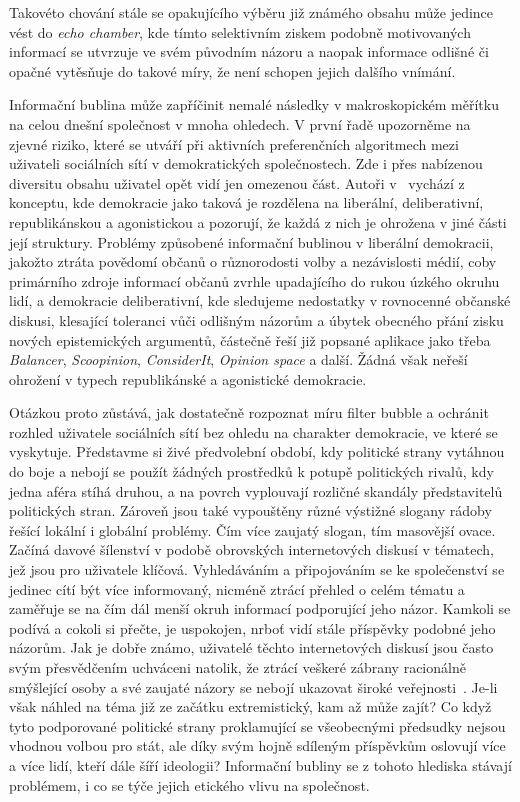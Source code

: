 \documentclass[12pt, a4paper]{article}
\numberwithin{equation}{section} 	%
\begin{document}
Takovéto chování stále se opakujícího výběru již známého obsahu může jedince vést do \textit{echo chamber}, kde tímto selektivním ziskem podobně motivovaných informací se utvrzuje ve svém původním názoru a naopak informace odlišné či opačné vytěsňuje do takové míry, že není schopen jejich dalšího vnímání.

Informační bublina může zapříčinit nemalé následky v makroskopickém mě\-ří\-tku na celou dnešní společnost v mnoha ohledech. V první řadě upozorněme na zjevné riziko, které se utváří při aktivních preferenčních algoritmech mezi uživateli sociálních sítí v demokratických společnostech. Zde i přes nabízenou diversitu obsahu uživatel opět vidí jen omezenou část. Autoři v~\cite{BreakingTheFilterBubble} vychází z konceptu, kde demokracie jako taková je rozdělena na liberální, deliberativní, republikánskou a agonistickou a pozorují, že každá z nich je ohrožena v jiné části její struktury. Problémy způsobené informační bublinou v liberální demokracii, jakožto ztráta povědomí občanů o různorodosti volby a nezávislosti médií, coby primárního zdroje informací občanů zvrhle upadajícího do rukou úzkého okruhu lidí, a demokracie deliberativní, kde sledujeme nedostatky v rovnocenné občanské diskusi, klesající toleranci vůči odlišným názorům a úbytek obecného přání zisku nových epistemických argumentů, částečně řeší již popsané aplikace jako třeba \textit{Balancer}, \textit{Scoopinion}, \textit{ConsiderIt}, \textit{Opinion space} a další. Žádná však neřeší ohrožení v typech republikánské a agonistické demokracie.

Otázkou proto zůstává, jak dostatečně rozpoznat míru filter bubble a ochránit rozhled uživatele sociálních sítí bez ohledu na charakter demokracie, ve které se vyskytuje. Představme si živé předvolební období, kdy politické strany vytáhnou do boje a nebojí se použít žádných prostředků k potupě politických rivalů, kdy jedna aféra stíhá druhou, a na povrch vyplouvají rozličné skandály představitelů politických stran. Zároveň jsou také vypouštěny různé výstižné slogany rádoby řešící lokální i globální problémy. Čím více zaujatý slogan, tím masovější ovace. Začíná davové šílenství v podobě obrovských internetových diskusí v tématech, jež jsou pro uživatele klíčová. Vyhledáváním a připojováním se ke společenství se jedinec cítí být více informovaný, nicméně ztrácí přehled o celém tématu a zaměřuje se na čím dál menší okruh informací podporující jeho názor. Kamkoli se podívá a cokoli si přečte, je uspokojen, nrboť vidí stále příspěvky podobné jeho názorům. Jak je dobře známo, uživatelé těchto internetových diskusí jsou často svým přesvědčením uchváceni natolik, že ztrácí veškeré zábrany racionálně smýšlející osoby a své zaujaté názory se nebojí ukazovat široké veřejnosti~\cite{DemocracyOnline}. Je-li však náhled na téma již ze začátku extremistický, kam až může zajít? Co když tyto podporované politické strany proklamující se všeobecnými předsudky nejsou vhodnou volbou pro stát, ale díky svým hojně sdíleným příspěvkům oslovují více a více lidí, kteří dále šíří ideologii? Informační bubliny se z tohoto hlediska stávají problémem, i co se týče jejich etického vlivu na společnost.
\end{document}
